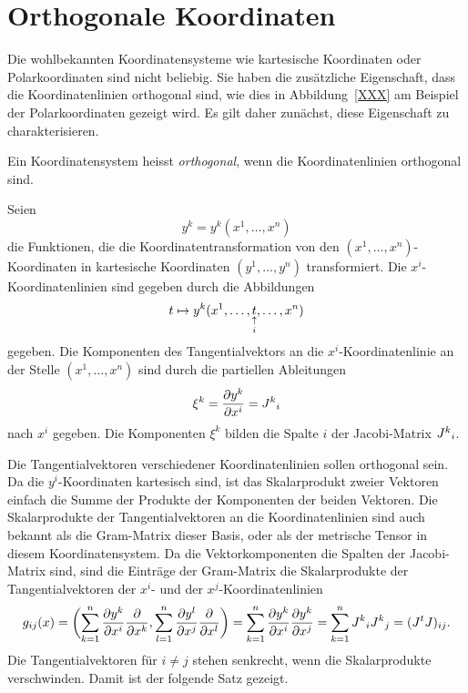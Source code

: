 %
%
%
%
\section{Orthogonale Koordinaten\label{diffortho:section:orthokoord}}
Die wohlbekannten Koordinatensysteme wie kartesische Koordinaten oder
Polarkoordinaten sind nicht beliebig.
Sie haben die zusätzliche Eigenschaft, dass die Koordinatenlinien
orthogonal sind, wie dies in Abbildung~\ref{XXX} am Beispiel der
Polarkoordinaten gezeigt wird.
Es gilt daher zunächst, diese Eigenschaft zu charakterisieren.

\begin{definition}
Ein Koordinatensystem heisst {\em orthogonal}, wenn die Koordinatenlinien
orthogonal sind.
%
%
\end{definition}

Seien 
\[
y^k
=
y^k(x^1,\dots,x^n)
\]
die Funktionen, die die Koordinatentransformation von den
$(x^1,\dots,x^n)$-Koordinaten in kartesische Koordinaten
$(y^1,\dots,y^n)$ transformiert.
Die $x^i$-Koordinatenlinien sind gegeben durch die Abbildungen
\[
t \mapsto y^k(x^1,\dots,\underset{\clap{$\uparrow\atop i$}}{t},\dots,x^n)
\]
gegeben.
Die Komponenten des Tangentialvektors an die $x^i$-Koordinatenlinie
an der Stelle $(x^1,\dots,x^n)$ sind durch die partiellen Ableitungen
\[
\xi^k
=
\frac{\partial y^k}{\partial x^i}
=
J^k\mathstrut_i
\]
nach $x^i$ gegeben.
Die Komponenten $\xi^k$ bilden die Spalte $i$ der Jacobi-Matrix
$J^k\mathstrut_i$.
%

Die Tangentialvektoren verschiedener Koordinatenlinien sollen orthogonal
sein.
Da die $y^i$-Koordinaten kartesisch sind, ist das Skalarprodukt zweier
Vektoren einfach die Summe der Produkte der Komponenten der beiden Vektoren.
Die Skalarprodukte der Tangentialvektoren an die Koordinatenlinien sind
auch bekannt als die Gram-Matrix dieser Basis, oder als der metrische
Tensor in diesem Koordinatensystem.
%
%
%
Da die Vektorkomponenten die Spalten der Jacobi-Matrix sind, sind die
Einträge der Gram-Matrix die Skalarprodukte der Tangentialvektoren der
$x^i$- und der $x^j$-Koordinatenlinien
\[
g_{ij}(x)
=
\biggl(
\sum_{k=1}^n
\frac{\partial y^k}{\partial x^i}
\frac{\partial}{\partial x^k}
,
\sum_{l=1}^n
\frac{\partial y^l}{\partial x^j}
\frac{\partial}{\partial x^l}
\biggr)
=
\sum_{k=1}^n
\frac{\partial y^k}{\partial x^i}
\frac{\partial y^k}{\partial x^j}
=
\sum_{k=1}^n
J^k\mathstrut_i
J^k\mathstrut_j
=
(J^tJ)_{ij}.
\]
Die Tangentialvektoren für $i\ne j$ stehen senkrecht, wenn die
Skalarprodukte verschwinden.
Damit ist der folgende Satz gezeigt.

